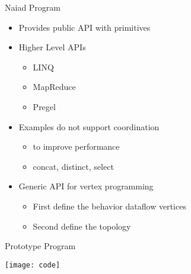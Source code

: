  \begin{frame}[t]{Naiad Program}
    \vspace{0.15cm}
    \begin{itemize}\setlength\itemsep{0.25cm}
     \item Provides public API with primitives
     \item Higher Level APIs
     \begin{itemize}\setlength\itemsep{0.25cm}
      \item LINQ
      \item MapReduce
      \item Pregel
     \end{itemize}
     \item Examples do not support coordination
     \begin{itemize}\setlength\itemsep{0.25cm}
     \item to improve performance
     \item concat, distinct, select
     \end{itemize}
     \item Generic API for vertex programming
     \begin{itemize}\setlength\itemsep{0.25cm}
     \item First define the behavior dataflow vertices
     \item Second define the topology
     \end{itemize}
   \end{itemize}

\end{frame}

\begin{frame}[t]{Prototype Program}

\begin{center}
  \texttt{[image: code]}
\end{center}

\end{frame}
